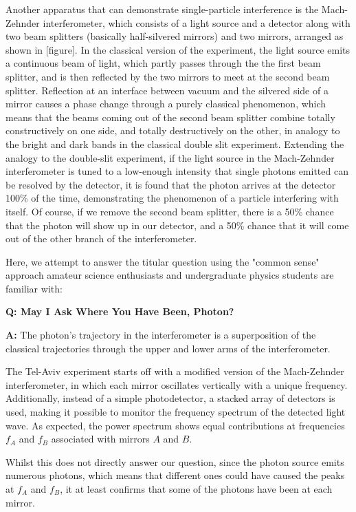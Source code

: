 \documentclass{article}
\newcommand{\Q}{\medskip\bfseries Q: }
\newcommand{\A}{\par\textbf{A:} \normalfont}
\begin{document}
Another apparatus that can demonstrate single-particle interference is the
Mach-Zehnder interferometer, which consists of a light source and a detector 
along with two beam splitters (basically half-silvered mirrors) and two 
mirrors, arranged as shown in [figure]. In the classical version of the 
experiment, the light source emits a continuous beam of light, which partly 
passes through the the first beam splitter, and is then reflected by the two 
mirrors to meet at the second beam splitter. Reflection at an interface between 
vacuum and the silvered side of a mirror causes a phase change through a purely 
classical phenomenon, which means that the beams coming out of the second beam 
splitter combine totally constructively on one side, and totally destructively 
on the other, in analogy to the bright and dark bands in the classical double 
slit experiment. Extending the analogy to the double-slit experiment, if the 
light source in the Mach-Zehnder interferometer is tuned to a low-enough 
intensity that single photons emitted can be resolved by the detector, it is 
found that the photon arrives at the detector 100\% of the time, demonstrating 
the phenomenon of a particle interfering with itself. Of course, if we remove 
the second beam splitter, there is a 50\% chance that the photon will show up 
in our detector, and a 50\% chance that it will come out of the other branch of 
the interferometer. 

Here, we attempt to answer the titular question using the "common sense" 
approach amateur science enthusiasts and undergraduate physics students are 
familiar with:


\Q May I Ask Where You Have Been, Photon?  

\A The photon's trajectory in the interferometer is a superposition of the 
classical trajectories through the upper and lower arms of the 
interferometer.\medskip

The Tel-Aviv experiment starts off with a modified version of the Mach-Zehnder 
interferometer, in which each mirror oscillates vertically with a unique 
frequency.  Additionally, instead of a simple photodetector, a stacked array of 
detectors is used, making it possible to monitor the frequency spectrum of the 
detected light wave. As expected, the power spectrum shows equal contributions 
at frequencies $f_A$ and $f_B$ associated with mirrors $A$ and $B$. 

Whilst this does not directly answer our question, since the photon source 
emits numerous photons, which means that different ones could have caused the 
peaks at $f_A$ and $f_B$, it at least confirms that some of the photons have 
been at each mirror. 
\end{document}
